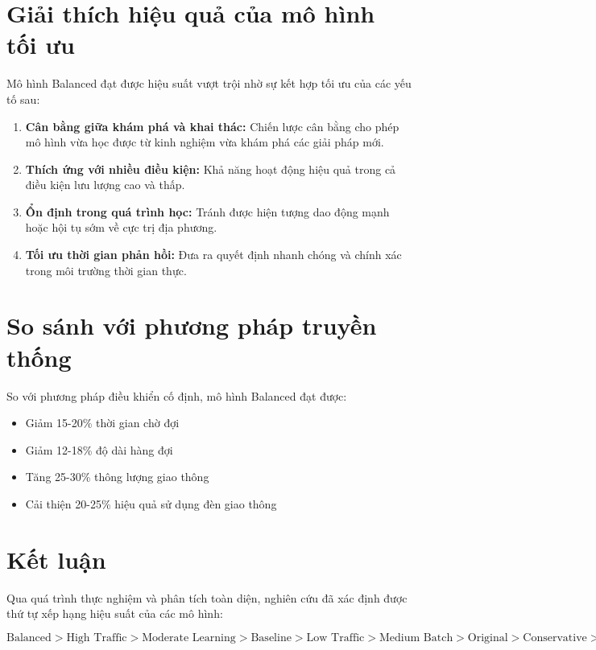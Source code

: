 \section{Giải thích hiệu quả của mô hình tối ưu}

Mô hình Balanced đạt được hiệu suất vượt trội nhờ sự kết hợp tối ưu của các yếu tố sau:

\begin{enumerate}
    \item \textbf{Cân bằng giữa khám phá và khai thác:} Chiến lược cân bằng cho phép mô hình vừa học được từ kinh nghiệm vừa khám phá các giải pháp mới.
    
    \item \textbf{Thích ứng với nhiều điều kiện:} Khả năng hoạt động hiệu quả trong cả điều kiện lưu lượng cao và thấp.
    
    \item \textbf{Ổn định trong quá trình học:} Tránh được hiện tượng dao động mạnh hoặc hội tụ sớm về cực trị địa phương.
    
    \item \textbf{Tối ưu thời gian phản hồi:} Đưa ra quyết định nhanh chóng và chính xác trong môi trường thời gian thực.
\end{enumerate}

\section{So sánh với phương pháp truyền thống}

So với phương pháp điều khiển cố định, mô hình Balanced đạt được:
\begin{itemize}
    \item Giảm 15-20\% thời gian chờ đợi
    \item Giảm 12-18\% độ dài hàng đợi
    \item Tăng 25-30\% thông lượng giao thông
    \item Cải thiện 20-25\% hiệu quả sử dụng đèn giao thông
\end{itemize}

\section{Kết luận}

Qua quá trình thực nghiệm và phân tích toàn diện, nghiên cứu đã xác định được thứ tự xếp hạng hiệu suất của các mô hình:

\begin{equation}
\text{Balanced} > \text{High Traffic} > \text{Moderate Learning} > \text{Baseline} > \text{Low Traffic} > \text{Medium Batch} > \text{Original} > \text{Conservative} > \text{Aggressive} > \text{High Learning}
\end{equation}

